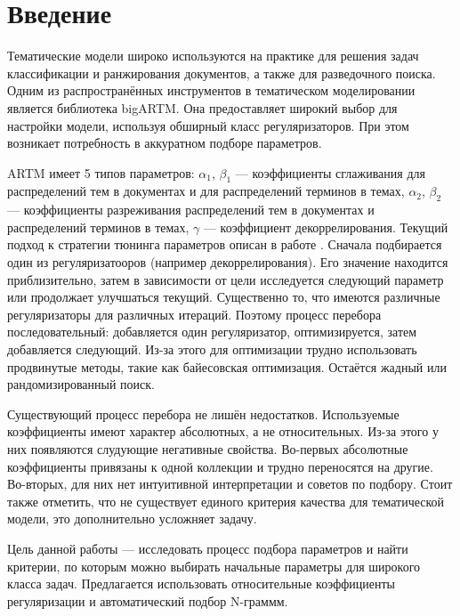 \documentclass[12pt,twoside]{article}
\title
    {Автоматическая настройка параметров BigARTM под широкий класс задач.}
\author
    {Гришанов~А.\,В., Булатов~B.\,Г., Воронцов~К.\,В.} %
    [Гришанов~А.\,В.$^1$, Булатов~B.\,Г.$^1$, Воронцов~К.\,В.$^1$] %
\begin{document}
\maketitle

\section{Введение}

Тематические модели широко используются на практике для решения задач классификации и ранжирования документов, а также для разведочного поиска\cite{Ianina2016}. Одним из распространённых инструментов в тематическом моделировании является библиотека bigARTM\cite{vorontsov2015bigartm}. Она предоставляет широкий выбор для настройки модели, используя обширный класс регуляризаторов. При этом возникает потребность в аккуратном подборе параметров.

ARTM имеет 5 типов параметров: $\alpha_1$, $\beta_1$ --- коэффициенты сглаживания для распределений тем в документах и для распределений терминов в темах, $\alpha_2$, $\beta_2$ --- коэффициенты разреживания распределений тем в документах и распределений терминов в темах, $\gamma$ --- коэффициент декоррелирования. 
Текущий подход к стратегии тюнинга параметров описан в работе \cite{Ianina2016}. Сначала подбирается один из регуляризатооров (например декоррелирования).  Его значение находится приблизительно, затем в зависимости от цели исследуется следующий параметр или продолжает улучшаться текущий. Существенно то, что имеются различные регуляризаторы  для различных итераций. Поэтому процесс перебора последовательный: добавляется один регуляризатор, оптимизируется, затем добавляется следующий. Из-за этого для оптимизации трудно использовать продвинутые методы, такие как байесовская оптимизация. Остаётся жадный или рандомизированный поиск.

Существующий процесс перебора не лишён недостатков. Используемые коэффициенты имеют характер абсолютных, а не относительных. Из-за этого у них появляются слудующие негативные свойства. Во-первых абсолютные коэффициенты привязаны к одной коллекции и трудно переносятся на другие. Во-вторых, для них нет интуитивной интерпретации и советов по подбору. Стоит также отметить, что не существует единого критерия качества для тематической модели, это дополнительно усложняет задачу.

Цель данной работы --- исследовать процесс подбора параметров и найти критерии, по которым можно выбирать начальные параметры для широкого класса задач. Предлагается использовать относительные коэффициенты регуляризации и автоматический подбор N-граммм.
\end{document}
